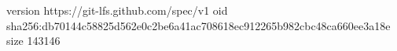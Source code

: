 version https://git-lfs.github.com/spec/v1
oid sha256:db70144c58825d562e0c2be6a41ac708618ec912265b982cbc48ca660ee3a18e
size 143146
